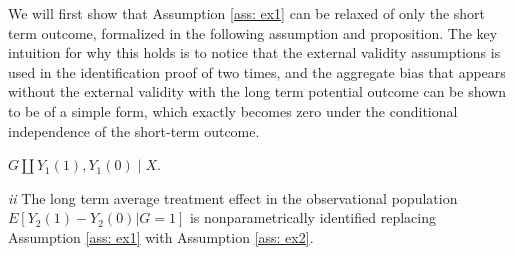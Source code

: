 \documentclass{article}
\begin{document}
We will first show that Assumption \ref{ass: ex1} can be relaxed  of only the short term outcome, formalized in the following assumption and proposition. The key intuition for why this holds is to notice that the external validity assumptions is used in the identification proof of \cite{athey2020combining} two times, and the aggregate bias that appears without the external validity with the long term potential outcome can be shown to be of a simple form, which exactly becomes zero under the conditional independence of the short-term outcome.
\begin{assumption}\label{ass: ex2}
    $G \amalg Y_1(1) ,Y_1(0) \mid X$.
\end{assumption}
\begin{proposition}
\textit{ii} The long term average treatment effect in the observational population $ E[Y_2(1) -Y_2(0) | G=1]$ is nonparametrically identified replacing Assumption \ref{ass: ex1} with Assumption \ref{ass: ex2}.
\end{proposition}
\end{document}
